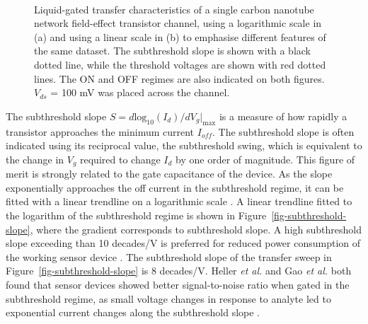 \documentclass[
  a4paper,
]{scrbook}
\begin{document}
\begin{figure}
\begin{minipage}[t]{0.45\linewidth}
{{}

}

\end{minipage}%
%
\begin{minipage}[t]{0.01\linewidth}

{\centering 

~

}

\end{minipage}%

\caption[Liquid-gated transfer characteristics of a CNT FET channel
showing the region of hole conduction and the subthreshold
regime.]{\label{fig-CNT-characteristics}Liquid-gated transfer
characteristics of a single carbon nanotube network field-effect
transistor channel, using a logarithmic scale in (a) and using a linear
scale in (b) to emphasise different features of the same dataset. The
subthreshold slope is shown with a black dotted line, while the
threshold voltages are shown with red dotted lines. The ON and OFF
regimes are also indicated on both figures. \(V_{ds}\) = 100 mV was
placed across the channel.}

\end{figure}

The subthreshold slope
\(S = d\textrm{log}_{10}(I_{d})/dV_g|_{\textrm{max}}\) is a measure of
how rapidly a transistor approaches the minimum current \(I_{off}\). The
subthreshold slope is often indicated using its reciprocal value, the
subthreshold swing, which is equivalent to the change in \(V_g\)
required to change \(I_d\) by one order of magnitude. This figure of
merit is strongly related to the gate capacitance of the device. As the
slope exponentially approaches the off current in the subthreshold
regime, it can be fitted with a linear trendline on a logarithmic scale
\autocite{Sze2006,Petti2016}. A linear trendline fitted to the logarithm
of the subthreshold regime is shown in
Figure~\ref{fig-subthreshold-slope}, where the gradient corresponds to
subthreshold slope. A high subthreshold slope exceeding than 10
decades/V is preferred for reduced power consumption of the working
sensor device \autocite{Petti2016}. The subthreshold slope of the
transfer sweep in Figure~\ref{fig-subthreshold-slope} is 8 decades/V.
Heller \emph{et al.} and Gao \emph{et al.} both found that sensor
devices showed better signal-to-noise ratio when gated in the
subthreshold regime, as small voltage changes in response to analyte led
to exponential current changes along the subthreshold slope
\autocite{Heller2009,Gao2010}.
\end{document}
